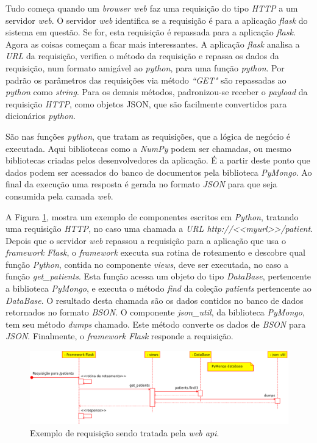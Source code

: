 Tudo começa quando um \emph{browser web} faz uma requisição do tipo \emph{HTTP} a um servidor \emph{web}. 
O servidor \emph{web} identifica se a requisição é para a aplicação \emph{flask} do sistema em questão. 
Se for, esta requisição é repassada para a aplicação \emph{flask}. 
Agora as coisas começam a ficar mais interessantes. 
A aplicação \emph{flask} analisa a \emph{URL} da requisição, verifica o método da requisição e repassa os dados da requisição, num formato amigável ao \emph{python}, para uma função \emph{python}. 
Por padrão os parâmetros das requisições via método \emph{``GET"} são repassadas ao \emph{python} como \emph{string}. 
Para os demais métodos, padronizou-se receber o \emph{payload} da requisição \emph{HTTP}, como objetos JSON, que são facilmente convertidos para dicionários \emph{python}.

São nas funções \emph{python}, que tratam as requisições, que a lógica de negócio é executada. 
Aqui bibliotecas como a \emph{NumPy} podem ser chamadas, ou mesmo bibliotecas criadas pelos desenvolvedores da aplicação. 
É a partir deste ponto que dados podem ser acessados do banco de documentos pela biblioteca \emph{PyMongo}. 
Ao final da execução uma resposta é gerada no formato \emph{JSON} para que seja consumida pela camada \emph{web}.

A Figura \ref{webapi_componentes}, mostra um exemplo de componentes escritos em \emph{Python}, tratando uma requisição \emph{HTTP}, no caso uma chamada a \emph{URL http://<<myurl>>/patient}.
Depois que o servidor \emph{web} repassou a requisição para a aplicação que usa o \emph{framework Flask}, o \emph{framework} executa sua rotina de roteamento e descobre qual função \emph{Python}, contida no componente \emph{views},  deve ser executada, no caso a função \emph{get\_patients}.
Esta função acessa um objeto do tipo \emph{DataBase}, pertencente a biblioteca \emph{PyMongo}, e executa o método \emph{find} da coleção \emph{patients} pertencente ao \emph{DataBase}.
O resultado desta chamada são os dados contidos no banco de dados retornados no formato \emph{BSON}.
O componente \emph{json\_util}, da biblioteca \emph{PyMongo}, tem seu método \emph{dumps} chamado.
Este método converte os dados de \emph{BSON} para \emph{JSON}.
Finalmente, o \emph{framework Flask} responde a requisição.


\begin{figure}[ht]
	\centering
	\includegraphics[width=17cm]{figuras/webapi_componentes.eps}
	\caption{Exemplo de requisição sendo tratada pela \emph{web api}.}
	\label{webapi_componentes}
\end{figure}

